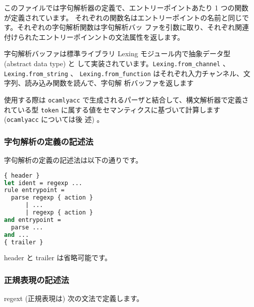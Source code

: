 \documentclass[a4paper,11pt]{jsarticle}
\begin{document}
このファイルでは字句解析器の定義で、エントリーポイントあたり 1 つの関数が定義されています。
それぞれの関数名はエントリーポイントの名前と同じです。それぞれの字句解析関数は字句解析バッ
ファを引数に取り、それぞれ関連付けられたエントリーポインントの文法属性を返します。

字句解析バッファは標準ライブラリ Lexing モジュール内で抽象データ型 (abstract data type) と
して実装されています。\verb|Lexing.from_channel| 、\verb|Lexing.from_string| 、
\verb|Lexing.from_function| はそれぞれ入力チャンネル、文字列、読み込み関数を読んで、字句解
析バッファを返します

使用する際は \verb|ocamlyacc| で生成されるパーザと結合して、構文解析器で定義されている型
\verb|token| に属する値をセマンティクスに基づいて計算します (\verb|ocamlyacc| については後
述) 。

\subsubsection{字句解析の定義の記述法}

字句解析の定義の記述法は以下の通りです。

\begin{lstlisting}[language=Caml]
{ header }
let ident = regexp ...
rule entrypoint =
  parse regexp { action }
      | ...
      | regexp { action }
and entrypoint =
  parse ...
and ...
{ trailer }
\end{lstlisting}

header と trailer は省略可能です。

\subsubsection{正規表現の記述法}

regext (正規表現は) 次の文法で定義します。
\end{document}
